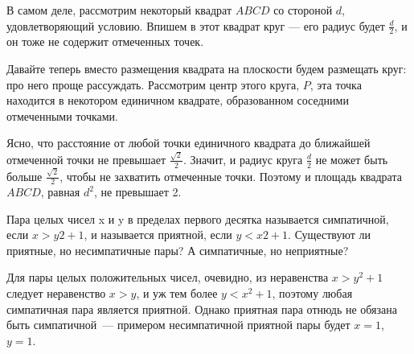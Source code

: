 \begin{itemize}
В самом деле, рассмотрим некоторый квадрат $ABCD$ со стороной $d$, удовлетворяющий условию.
Впишем в этот квадрат круг --- его радиус будет $\frac{d}{2}$, и он тоже не содержит
отмеченных точек. 

\begin{center}\end{center}

Давайте теперь вместо размещения квадрата на плоскости будем размещать круг:
про него проще рассуждать.
Рассмотрим центр этого круга, $P$, эта точка находится в некотором
единичном квадрате, образованном соседними отмеченными точками.

\begin{center}\end{center}

Ясно, что расстояние от любой точки единичного квадрата до ближайшей отмеченной 
точки не превышает $\frac{\sqrt{2}}{2}$. Значит, и радиус круга $\frac{d}{2}$ не может быть 
больше $\frac{\sqrt{2}}{2}$, чтобы не захватить отмеченные точки. 
Поэтому и площадь квадрата $ABCD$, равная $d^2$, не превышает 2.
\end{itemize}


\begin{itemize}
\itC Пара целых чисел x и y в пределах первого десятка называется симпатичной, если $x>y2+1$, 
и называется  приятной, если $y<x2+1$. Существуют ли приятные, но несимпатичные пары? 
А симпатичные, но неприятные?

\itr Для пары целых положительных чисел, очевидно, из неравенства
$x>y^2+1$ следует неравенство $x>y$, и уж тем более $y<x^2+1$,
поэтому любая симпатичная пара является приятной. Однако приятная пара отнюдь 
не обязана быть симпатичной~--- примером несимпатичной приятной пары будет
$x=1$, $y=1$.
\end{itemize}

